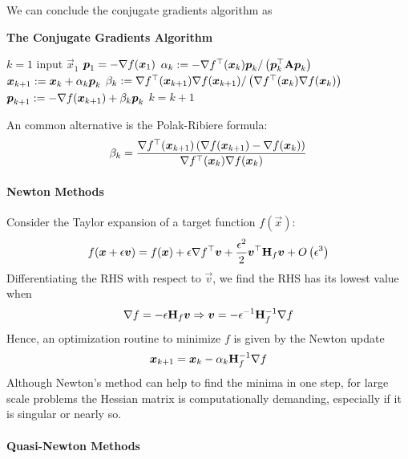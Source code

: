 We can conclude the conjugate gradients algorithm as
\begin{algorithm}[H]
	\caption*{\bf The Conjugate Gradients Algorithm}
	\begin{algorithmic}
		\State $k=1$
		\State input $\vec{x}_1$
		\State $\boldsymbol{p}_1=-\nabla f(\boldsymbol{x}_1)$
			\State $\alpha_k:=-\nabla f^\top(\boldsymbol{x}_k)\boldsymbol{p}_k/\left(\boldsymbol{p}_k^\top\mathbf{A}\boldsymbol{p}_k\right)$
			\State $\boldsymbol{x}_{k+1}:=\boldsymbol{x}_k+\alpha_k\boldsymbol{p}_k$
			\State $\beta_k:=\nabla f^\top(\boldsymbol{x}_{k+1})\nabla f(\boldsymbol{x}_{k+1})/\left(\nabla f^\top(\boldsymbol{x}_k)\nabla f(\boldsymbol{x}_k)\right)$
			\State $\boldsymbol{p}_{k+1}:=-\nabla f(\boldsymbol{x}_{k+1})+\beta_k\boldsymbol{p}_k$
			\State $k=k+1$
		\EndWhile
	\end{algorithmic}
\end{algorithm}
An common alternative is the Polak-Ribiere formula:
\begin{align*}
	\beta_k=\frac{\nabla f^\top(\boldsymbol{x}_{k+1})\left(\nabla f(\boldsymbol{x}_{k+1})-\nabla f(\boldsymbol{x}_k)\right)}{\nabla f^\top(\boldsymbol{x}_k)\nabla f(\boldsymbol{x}_k)}
\end{align*}

\paragraph{Newton Methods}

Consider the Taylor expansion of a target function $f(\vec{x})$:
\begin{align*}
	f(\boldsymbol{x}+\epsilon\boldsymbol{v})=f(\boldsymbol{x})+\epsilon\nabla f{}^\top\boldsymbol{v}+\frac{\epsilon^2}{2}\boldsymbol{v}{}^\top \mathbf{H}_f\boldsymbol{v}+O\left(\epsilon^3\right)
\end{align*}
Differentiating the RHS with respect to $\vec{v}$, we find the RHS has its lowest value when
\begin{align*}
	\nabla f=-\epsilon\mathbf{H}_f\boldsymbol{v}\Rightarrow\boldsymbol{v}=-\epsilon^{-1}\mathbf{H}_f^{-1}\nabla f
\end{align*}
Hence, an optimization routine to minimize $f$ is given by the Newton update
\begin{align*}
	\boldsymbol{x}_{k+1}=\boldsymbol{x}_k-\alpha_k\mathbf{H}_f^{-1}\nabla f
\end{align*}
Although Newton's method can help to find the minima in one step, for large scale problems the Hessian matrix is computationally demanding, especially if it is singular or nearly so.

\paragraph{Quasi-Newton Methods}

